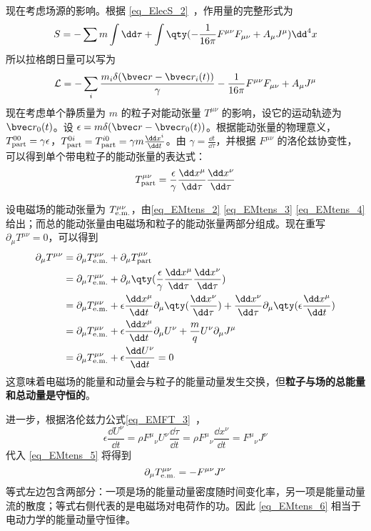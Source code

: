 现在考虑场源的影响。根据 \autoref{eq_ElecS_2}~，作用量的完整形式为
\begin{equation}
S=-\sum{m\int \dd \tau}+\int \qty(-\frac{1}{16\pi}F^{\mu\nu}F_{\mu\nu}+A_\mu J^\mu ){\dd}^4 x
\end{equation}
所以拉格朗日量可以写为
\begin{equation}
\mathcal{L}=-\sum_i \frac{m_i\delta(\bvec r-\bvec r_i(t))}{\gamma}-\frac{1}{16\pi}F^{\mu\nu}F_{\mu\nu}+A_\mu J^\mu
\end{equation}
现在考虑单个静质量为 $m$ 的粒子对能动张量 $T^{\mu\nu}$ 的影响，设它的运动轨迹为 $\bvec r_0(t)$。设 $\epsilon=m\delta(\bvec r-\bvec r_0(t))$。根据能动张量的物理意义，$T_{\rm{part}}^{00}=\gamma \epsilon$，$T_{\rm{part}}^{0i}=T_{\rm{part}}^{i0}=\gamma m \frac{\dd x^i}{\dd t}$。由 $\gamma=\frac{\dd t}{\dd \tau}$，并根据 $F^{\mu\nu}$ 的洛伦兹协变性，可以得到单个带电粒子的能动张量的表达式：
\begin{equation}
T_{\rm{part}}^{\mu\nu}=\frac{\epsilon}{\gamma}\frac{\dd x^\mu}{\dd \tau}\frac{\dd x^\nu}{\dd \tau}
\end{equation}

设电磁场的能动张量为 $T_{\rm{e.m.}}^{\mu\nu}$，由\autoref{eq_EMtens_2} \autoref{eq_EMtens_3} \autoref{eq_EMtens_4} 给出；而总的能动张量由电磁场和粒子的能动张量两部分组成。现在重写 $\partial_\mu T^{\mu\nu}=0$，可以得到
\begin{equation}\label{eq_EMtens_5}
\begin{aligned}
\partial_{\mu}T^{\mu\nu}&=\partial_\mu T_{\rm{e.m.}}^{\mu\nu}+\partial_\mu T_{\rm{part}}^{\mu\nu}\\
&=\partial_\mu T_{\rm{e.m.}}^{\mu\nu}+\partial_\mu\qty(\frac{\epsilon}{\gamma}\frac{\dd x^\mu}{\dd \tau}\frac{\dd x^\nu}{\dd \tau})\\
&=\partial_\mu T_{\rm{e.m.}}^{\mu\nu}+\epsilon \frac{\dd x^\mu}{\dd t}\partial_\mu\qty(\frac{\dd x^\nu}{\dd \tau})+\frac{\dd x^\nu}{\dd \tau}\partial_\mu\qty(\epsilon \frac{\dd x^\mu}{\dd t})\\
&=\partial_\mu T_{\rm{e.m.}}^{\mu\nu}+\epsilon \frac{\dd x^\mu}{\dd t}\partial_\mu U^\nu+\frac{m}{q}U^\nu\partial_\mu J^\mu \\
&=\partial_\mu T_{\rm{e.m.}}^{\mu\nu}+\epsilon \frac{\dd U^\nu}{\dd t}=0
\end{aligned}
\end{equation}
这意味着电磁场的能量和动量会与粒子的能量动量发生交换，但\textbf{粒子与场的总能量和总动量是守恒的}。

进一步，根据洛伦兹力公式\autoref{eq_EMFT_3}~，
\begin{equation}
\epsilon \frac{\dd U^\nu}{\dd t}=\rho F^\mu{}_\nu U^\nu \frac{\dd \tau}{\dd t}=\rho F^\mu{}_\nu\frac{\dd x^\nu}{\dd t}=F^\mu{}_\nu J^\nu 
\end{equation}
代入 \autoref{eq_EMtens_5} 将得到
\begin{equation}\label{eq_EMtens_6}
\partial_\mu T_{\rm{e.m.}}^{\mu\nu}=-F^{\mu\nu}J^\nu
\end{equation}
等式左边包含两部分：一项是场的能量动量密度随时间变化率，另一项是能量动量流的散度；等式右侧代表的是电磁场对电荷作的功。因此 \autoref{eq_EMtens_6} 相当于电动力学的能量动量守恒律。